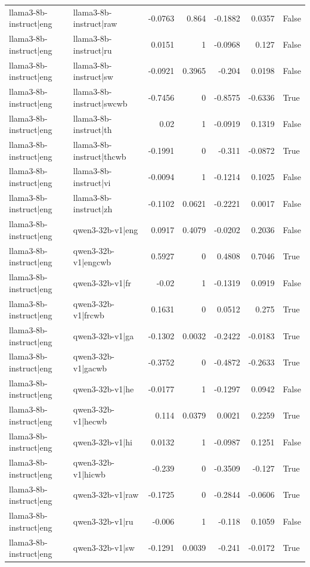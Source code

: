 \begin{table}
\begin{tabular}{l l r r r r l}
llama3-8b-instruct|eng & llama3-8b-instruct|raw & -0.0763 & 0.864 & -0.1882 & 0.0357 & False \\
llama3-8b-instruct|eng & llama3-8b-instruct|ru & 0.0151 & 1 & -0.0968 & 0.127 & False \\
llama3-8b-instruct|eng & llama3-8b-instruct|sw & -0.0921 & 0.3965 & -0.204 & 0.0198 & False \\
llama3-8b-instruct|eng & llama3-8b-instruct|swcwb & -0.7456 & 0 & -0.8575 & -0.6336 & True \\
llama3-8b-instruct|eng & llama3-8b-instruct|th & 0.02 & 1 & -0.0919 & 0.1319 & False \\
llama3-8b-instruct|eng & llama3-8b-instruct|thcwb & -0.1991 & 0 & -0.311 & -0.0872 & True \\
llama3-8b-instruct|eng & llama3-8b-instruct|vi & -0.0094 & 1 & -0.1214 & 0.1025 & False \\
llama3-8b-instruct|eng & llama3-8b-instruct|zh & -0.1102 & 0.0621 & -0.2221 & 0.0017 & False \\
llama3-8b-instruct|eng & qwen3-32b-v1|eng & 0.0917 & 0.4079 & -0.0202 & 0.2036 & False \\
llama3-8b-instruct|eng & qwen3-32b-v1|engcwb & 0.5927 & 0 & 0.4808 & 0.7046 & True \\
llama3-8b-instruct|eng & qwen3-32b-v1|fr & -0.02 & 1 & -0.1319 & 0.0919 & False \\
llama3-8b-instruct|eng & qwen3-32b-v1|frcwb & 0.1631 & 0 & 0.0512 & 0.275 & True \\
llama3-8b-instruct|eng & qwen3-32b-v1|ga & -0.1302 & 0.0032 & -0.2422 & -0.0183 & True \\
llama3-8b-instruct|eng & qwen3-32b-v1|gacwb & -0.3752 & 0 & -0.4872 & -0.2633 & True \\
llama3-8b-instruct|eng & qwen3-32b-v1|he & -0.0177 & 1 & -0.1297 & 0.0942 & False \\
llama3-8b-instruct|eng & qwen3-32b-v1|hecwb & 0.114 & 0.0379 & 0.0021 & 0.2259 & True \\
llama3-8b-instruct|eng & qwen3-32b-v1|hi & 0.0132 & 1 & -0.0987 & 0.1251 & False \\
llama3-8b-instruct|eng & qwen3-32b-v1|hicwb & -0.239 & 0 & -0.3509 & -0.127 & True \\
llama3-8b-instruct|eng & qwen3-32b-v1|raw & -0.1725 & 0 & -0.2844 & -0.0606 & True \\
llama3-8b-instruct|eng & qwen3-32b-v1|ru & -0.006 & 1 & -0.118 & 0.1059 & False \\
llama3-8b-instruct|eng & qwen3-32b-v1|sw & -0.1291 & 0.0039 & -0.241 & -0.0172 & True \\

\end{tabular}
\end{table}

